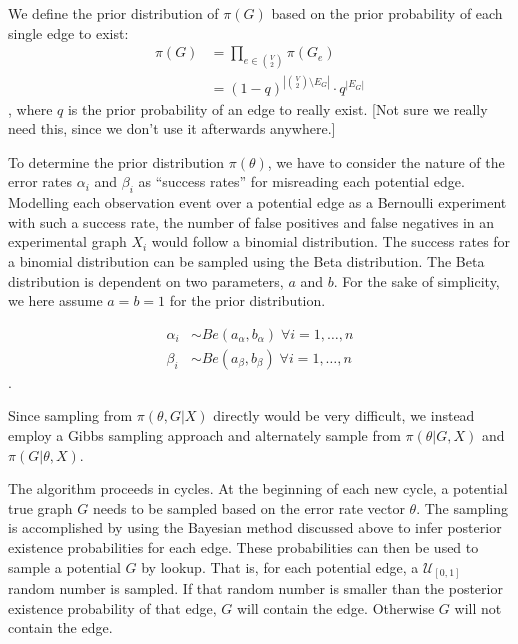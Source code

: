 \documentclass{bioinfo}
\newcommand{\note}[1]{{\color{red}[#1]}}
\begin{document}
\begin{methods}
We define the prior distribution of $\pi(G)$ based on the prior probability of each single edge to exist:
\begin{align}
  \pi(G) &= \prod_{e \in \binom{V}{2}} \pi(G_e)\\
         &= (1-q)^{\left |\binom{V}{2}\setminus E_G \right |} \cdot q^{|E_G|}
\end{align},
where $q$ is the prior probability of an edge to really exist. \note{Not sure we really need this, since we don't use it afterwards anywhere.}

To determine the prior distribution $\pi(\theta)$, we have to consider the nature of the error rates $\alpha_i$ and $\beta_i$ as ``success rates'' for misreading each potential edge. Modelling each observation event over a potential edge as a Bernoulli experiment with such a success rate, the number of false positives and false negatives in an experimental graph $X_i$ would follow a binomial distribution. The success rates for a binomial distribution can be sampled using the Beta distribution. The Beta distribution is dependent on two parameters, $a$ and $b$. For the sake of simplicity, we here assume $a = b = 1$ for the prior distribution.


\begin{align}
  \alpha_i &\sim Be(a_\alpha, b_\alpha) \; \forall i=1,\ldots,n\\
  \beta_i &\sim Be(a_\beta, b_\beta) \; \forall i=1,\ldots,n
\end{align}.


Since sampling from $\pi(\theta,G|X)$ directly would be very difficult, we instead employ a Gibbs sampling approach \citep{gelfand_sampling-based_1990} and alternately sample from $\pi(\theta|G,X)$ and $\pi(G|\theta,X)$.

The algorithm proceeds in cycles. At the beginning of each new cycle, a potential true graph $G$ needs to be sampled based on the error rate vector $\theta$. The sampling is accomplished by using the Bayesian method discussed above to infer posterior existence probabilities for each edge. These probabilities can then be used to sample a potential $G$ by lookup. That is, for each potential edge, a $\mathcal{U}_{[0,1]}$ random number is sampled. If that random number is smaller than the posterior existence probability of that edge, $G$ will contain the edge. Otherwise $G$ will not contain the edge.


\end{methods}
\end{document}

